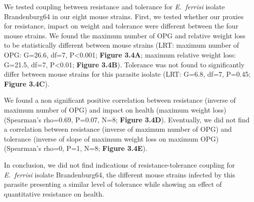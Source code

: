 We tested coupling between resistance and tolerance for \textit{E.~ferrisi} isolate Brandenburg64 in our eight mouse strains. First, we tested whether our proxies for resistance, impact on weight and tolerance were different between the four mouse strains. We found the maximum number of OPG and relative weight loss to be statistically different between mouse strains (LRT: maximum number of OPG: G=26.6, df=7, P<0.001; \textbf{Figure 3.4A}; maximum relative weight loss: G=21.5, df=7, P<0.01; \textbf{Figure 3.4B}). Tolerance was not found to significantly differ between mouse strains for this parasite isolate (LRT: G=6.8, df=7, P=0.45; \textbf{Figure 3.4C}).\par

We found a non significant positive correlation between resistance (inverse of maximum number of OPG) and impact on health (maximum weight loss) (Spearman's rho=0.69, P=0.07, N=8; \textbf{Figure 3.4D}). Eventually, we did not find a correlation between resistance (inverse of maximum number of OPG) and tolerance (inverse of slope of maximum weight loss on maximum OPG) (Spearman's rho=0, P=1, N=8; \textbf{Figure 3.4E}). \par

In conclusion, we did not find indications of resistance-tolerance coupling for \textit{E.~ferrisi} isolate Brandenburg64, the different mouse strains infected by this parasite presenting a similar level of tolerance while showing an effect of quantitative resistance on health.\par

